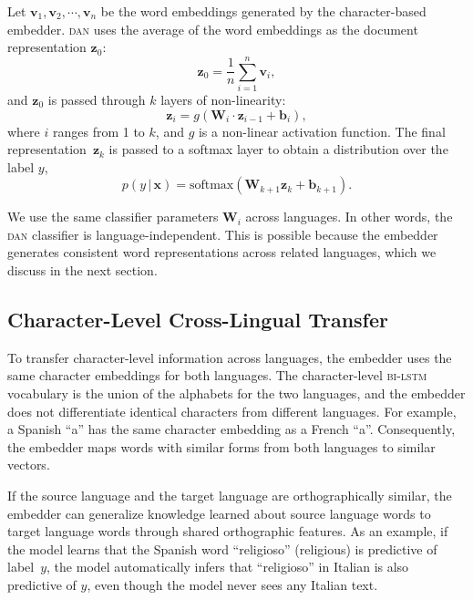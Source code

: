 \documentclass[letterpaper]{article} %
\newcommand{\g}{\, | \,}
\newcommand{\abr}[1]{\textsc{#1}}
\newcommand{\vect}[1]{\bm{\mathbf{#1}}}
\begin{document}
Let  $\vect{v}_1,\vect{v}_2,\cdots,\vect{v}_n$ be the word embeddings
generated by the character-based embedder.
\abr{dan} uses the average of the word embeddings as the document
representation $\vect{z}_0$:
\begin{equation}
  \vect{z}_0 = \frac{1}{n}\sum_{i=1}^n \vect{v}_i,
\end{equation}
and $\vect{z}_0$ is passed through $k$ layers of non-linearity:
\begin{equation}
  \vect{z}_i = g(\vect{W}_i \cdot \vect{z}_{i-1} + \vect{b}_i),
\end{equation}
where $i$ ranges from 1 to $k$, and $g$ is a non-linear activation
function.
The final representation~$\vect{z}_{k}$ is passed to a softmax layer to obtain
a distribution over the label $y$,
\begin{equation}
    p(y \g \vect{x}) = \text{softmax}(\vect{W}_{k+1} \vect{z}_k + \vect{b}_{k+1}).
\end{equation}

We use the same classifier parameters $\vect{W}_i$ across languages.
In other words, the \abr{dan} classifier is language-independent.
This is possible because the embedder generates consistent word representations
across related languages, which we discuss in the next section.

\subsection{Character-Level Cross-Lingual Transfer}
\label{ssec:char}

To transfer character-level information across languages, the embedder uses
the same character embeddings for both languages.
The character-level \abr{bi-lstm} vocabulary is the union of the alphabets for
the two languages, and the embedder does not differentiate identical characters
from different languages.
For example, a Spanish ``a'' has the same character embedding as a French
``a''.
Consequently, the embedder maps words with similar forms from both languages to
similar vectors.

If the source language and the target language are orthographically similar, the
embedder can generalize knowledge learned about source language words to target
language words through shared orthographic features.  As an example, if the
model learns that the Spanish word ``religioso'' (religious) is predictive of
label~$y$, the model automatically infers that ``religioso'' in Italian is also
predictive of $y$, even though the model never sees any Italian text.
\end{document}
